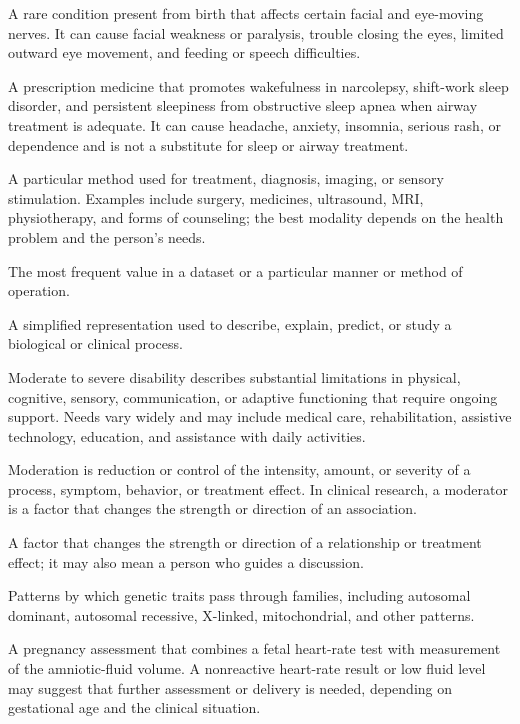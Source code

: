  A rare condition present from birth that affects certain facial and eye-moving nerves. It can cause facial weakness or paralysis, trouble closing the eyes, limited outward eye movement, and feeding or speech difficulties.

 A prescription medicine that promotes wakefulness in narcolepsy, shift-work sleep disorder, and persistent sleepiness from obstructive sleep apnea when airway treatment is adequate. It can cause headache, anxiety, insomnia, serious rash, or dependence and is not a substitute for sleep or airway treatment.

 A particular method used for treatment, diagnosis, imaging, or sensory stimulation. Examples include surgery, medicines, ultrasound, MRI, physiotherapy, and forms of counseling; the best modality depends on the health problem and the person's needs.

 The most frequent value in a dataset or a particular manner or method of operation.

 A simplified representation used to describe, explain, predict, or study a biological or clinical process.

 Moderate to severe disability describes substantial limitations in physical, cognitive, sensory, communication, or adaptive functioning that require ongoing support. Needs vary widely and may include medical care, rehabilitation, assistive technology, education, and assistance with daily activities.

 Moderation is reduction or control of the intensity, amount, or severity of a process, symptom, behavior, or treatment effect. In clinical research, a moderator is a factor that changes the strength or direction of an association.

 A factor that changes the strength or direction of a relationship or treatment effect; it may also mean a person who guides a discussion.

 Patterns by which genetic traits pass through families, including autosomal dominant, autosomal recessive, X-linked, mitochondrial, and other patterns.

 A pregnancy assessment that combines a fetal heart-rate test with measurement of the amniotic-fluid volume. A nonreactive heart-rate result or low fluid level may suggest that further assessment or delivery is needed, depending on gestational age and the clinical situation.


